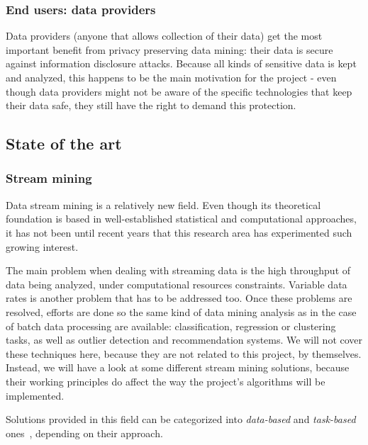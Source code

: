 \subsubsection{End users: data providers}

Data providers (anyone that allows collection of their data) get the most important benefit from privacy preserving data mining: their data is secure against information disclosure attacks. Because all kinds of sensitive data is kept and analyzed, this happens to be the main motivation for the project - even though data providers might not be aware of the specific technologies that keep their data safe, they still have the right to demand this protection.

\subsection{State of the art}
\label{section:state-of-the-art}

\subsubsection{Stream mining}

Data stream mining is a relatively new field. Even though its theoretical foundation is based in well-established statistical and computational approaches, it has not been until recent years that this research area has experimented such growing interest.

The main problem when dealing with streaming data is the high throughput of data being analyzed, under computational resources constraints. Variable data rates is another problem that has to be addressed too. Once these problems are resolved, efforts are done so the same kind of data mining analysis as in the case of batch data processing are available: classification, regression or clustering tasks, as well as outlier detection and recommendation systems. We will not cover these techniques here, because they are not related to this project, by themselves. Instead, we will have a look at some different stream mining solutions, because their working principles do affect the way the project’s algorithms will be implemented.

Solutions provided in this field can be categorized into \textit{data-based} and \textit{task-based} ones~\cite{miningDataStreams}, depending on their approach.

